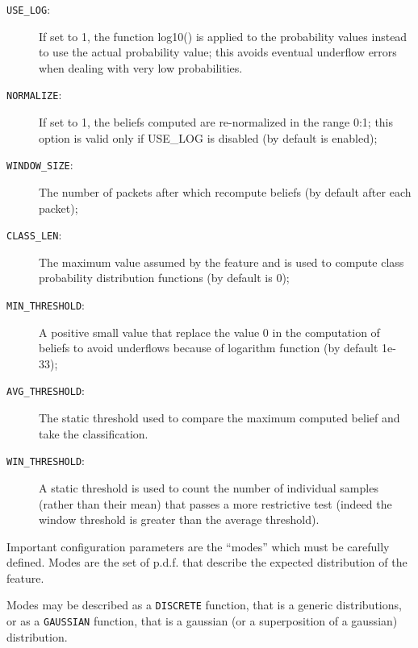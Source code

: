 \documentclass[11pt]{article}
\begin{document}
\begin{description}

\item[{\texttt{USE\_LOG}:}] \mbox{}

If set to 1, the function log10() is applied to the probability values 
instead to use the actual probability value; this avoids eventual underflow errors when dealing 
with very low probabilities.


\item[{\texttt{NORMALIZE}:}] \mbox{}

If set to 1, the beliefs computed are re-normalized in the range 0:1;
this option is valid only if USE\_LOG is disabled (by default is enabled);


\item[{\texttt{WINDOW\_SIZE}:}] \mbox{}

The number of packets after which recompute beliefs (by default after each packet);


\item[{\texttt{CLASS\_LEN}:}] \mbox{}

The maximum value assumed by the feature and is used to compute class probability
distribution functions (by default is 0);


\item[{\texttt{MIN\_THRESHOLD}:}] \mbox{}

A positive small value that replace the value 0 in the computation of beliefs
to avoid underflows because of logarithm function (by default 1e-33);


\item[{\texttt{AVG\_THRESHOLD}:}] \mbox{}

The static threshold used to compare the maximum computed belief and take the classification.


\item[{\texttt{WIN\_THRESHOLD}:}] \mbox{}

A static threshold is used to count the number of individual samples (rather than
their mean) that passes a more restrictive test (indeed the window threshold
is greater than the average threshold).

\end{description}


Important configuration parameters are the ``modes'' which must be carefully defined. Modes are 
the set of p.d.f. that describe the expected distribution of the feature.



Modes may be described as a \texttt{DISCRETE} function, that is a generic distributions, 
or as a \texttt{GAUSSIAN} function, that is a gaussian (or a superposition of a gaussian) distribution.
\end{document}
